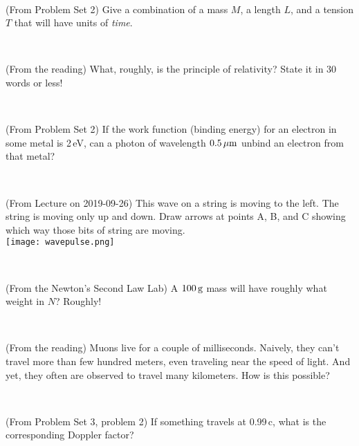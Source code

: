 \documentclass[12pt, letterpaper]{article}
\begin{document}
\vfill ~

\begin{problem}
(From Problem Set 2)
Give a combination of a mass $M$, a length $L$, and a tension $T$ that will have
units of \emph{time}.
\end{problem}

\vfill ~

\begin{problem}
(From the reading)
What, roughly, is the principle of relativity? State it in 30 words or less!
\end{problem}

\vfill ~

\begin{problem}
(From Problem Set 2)
If the work function (binding energy) for an electron in some metal is 2\,eV, can
a photon of wavelength $0.5\,\mu\mathrm{m}$ unbind an electron from that metal?
\end{problem}

\vfill ~

\cleardoublepage

\begin{problem}
(From Lecture on 2019-09-26)
This wave on a string is moving to the left. The string is moving only
up and down. Draw arrows at points A, B, and C showing which way those
bits of string are moving.\\
\texttt{[image: wavepulse.png]}
\end{problem}

\vfill ~

\begin{problem}
(From the Newton's Second Law Lab)
A $100\,\mathrm{g}$ mass will have roughly what weight in $N$? Roughly!
\end{problem}

\vfill ~

\begin{problem}
(From the reading)
Muons live for a couple of milliseconds. Naively, they can't travel more than few hundred meters,
even traveling near the speed of light. And yet, they often are observed to travel many kilometers.
How is this possible?
\end{problem}

\vfill ~

\begin{problem}
(From Problem Set 3, problem 2)
If something travels at 0.99\,c, what is the corresponding Doppler factor?
\end{problem}

\vfill ~
\end{document}
